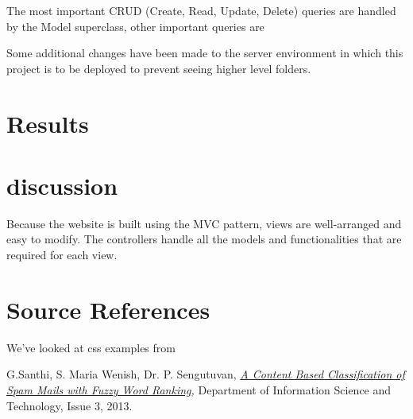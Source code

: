 \documentclass[journal]{IEEEtran}
\begin{document}
The most important CRUD (Create, Read, Update, Delete) queries are handled by the Model superclass, other important queries are 


Some additional changes have been made to the server environment in which this project is to be deployed to prevent seeing higher level folders.

\section{Results}
\label{subsec:results}

\section{discussion}
\label{subsec:discussion}


Because the website is built using the MVC pattern, views are well-arranged and easy to modify. The controllers handle all the models and functionalities that are required for each view.


\section{Source References}
\label{subsec:source references}
We've looked at css examples from \cite{w3}

\begin{thebibliography}{9}

		G.Santhi, S. Maria Wenish, Dr. P. Sengutuvan,
		\textit{
			\href{https://github.com/Menziess/Fuzzy-Logic-Email-Classification/raw/master/report/res/a_content_based_classification_of_spam_mails_with_fuzzy_word_ranking.pdf}{A Content Based Classification of Spam Mails with Fuzzy Word Ranking},
		}
		Department of Information Science and Technology,
		Issue 3,
		2013.

\end{thebibliography}
\end{document}
